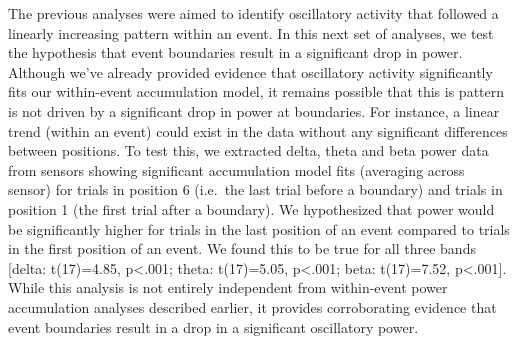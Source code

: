 The previous analyses were aimed to identify oscillatory activity that
followed a linearly increasing pattern within an event. In this next set
of analyses, we test the hypothesis that event boundaries result in a
significant drop in power. Although we've already provided evidence that
oscillatory activity significantly fits our within-event accumulation
model, it remains possible that this is pattern is not driven by a
significant drop in power at boundaries. For instance, a linear trend
(within an event) could exist in the data without any significant
differences between positions. To test this, we extracted delta, theta
and beta power data from sensors showing significant accumulation model
fits (averaging across sensor) for trials in position 6 (i.e.~the last
trial before a boundary) and trials in position 1 (the first trial after
a boundary). We hypothesized that power would be significantly higher
for trials in the last position of an event compared to trials in the
first position of an event. We found this to be true for all three bands
{[}delta: t(17)=4.85, p\textless{}.001; theta: t(17)=5.05,
p\textless{}.001; beta: t(17)=7.52, p\textless{}.001{]}. While this
analysis is not entirely independent from within-event power
accumulation analyses described earlier, it provides corroborating
evidence that event boundaries result in a drop in a significant
oscillatory power.

